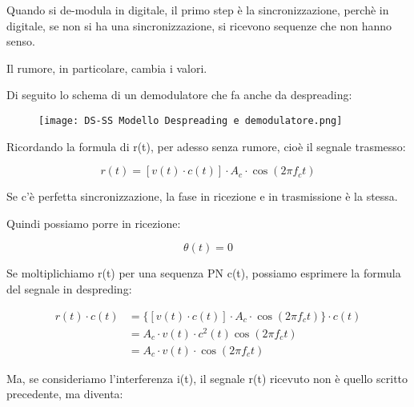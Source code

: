 Quando si de-modula in digitale, 
il primo step è la sincronizzazione, 
perchè in digitale, se non si ha una sincronizzazione, 
si ricevono sequenze che non hanno senso. \newline 

Il rumore, in particolare, cambia i valori. \newline 

Di seguito lo schema di un demodulatore che fa anche da despreading: 

\begin{figure}[h]
    \centering
    \texttt{[image: DS-SS Modello Despreading e demodulatore.png]}
\end{figure}

Ricordando la formula di r(t), per adesso senza rumore,
cioè il segnale trasmesso: 

{
    \Large 
    \begin{equation}
        r(t)
        =
       \left[v(t) \cdot c(t)\right]
            \cdot 
            A_c \cdot \cos(2 \pi f_c t)
    \end{equation}
}

Se c'è perfetta sincronizzazione, 
la fase in ricezione e in trasmissione è 
la stessa. \newline 

Quindi possiamo porre in ricezione: 

{
    \Large 
    \begin{equation}
        \theta (t) = 0
    \end{equation}
}

Se moltiplichiamo r(t) per una sequenza PN c(t), 
possiamo esprimere la formula del segnale in despreding: 

{
    \Large 
    \begin{equation}
        \begin{split}
            r(t) \cdot c(t)
            &= 
            \{
            \left[v(t) \cdot c(t)\right]
            \cdot 
            A_c \cdot \cos(2 \pi f_c t)
            \}
            \cdot
            c(t)
            \\
            &= 
            A_c \cdot v(t) \cdot c^{2} (t) \cos(2 \pi f_c t)
            \\
            &= 
            A_c \cdot v(t) \cdot \cos(2 \pi f_c t)
        \end{split}
    \end{equation}
}

Ma, se consideriamo l'interferenza i(t), 
il segnale r(t) ricevuto non è quello scritto precedente, 
ma diventa: 

